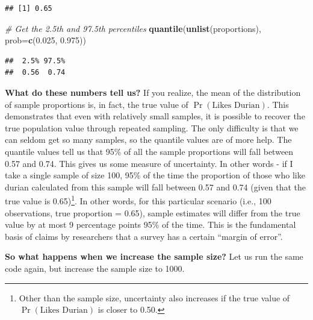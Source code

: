 \documentclass[openany]{book}
\newenvironment{Shaded}{\begin{snugshade}}{\end{snugshade}}
\newcommand{\KeywordTok}[1]{\textcolor[rgb]{0.13,0.29,0.53}{\textbf{#1}}}
\newcommand{\DataTypeTok}[1]{\textcolor[rgb]{0.13,0.29,0.53}{#1}}
\newcommand{\FloatTok}[1]{\textcolor[rgb]{0.00,0.00,0.81}{#1}}
\newcommand{\CommentTok}[1]{\textcolor[rgb]{0.56,0.35,0.01}{\textit{#1}}}
\newcommand{\NormalTok}[1]{#1}
\let\rmarkdownfootnote\footnote%
\def\footnote{\protect\rmarkdownfootnote}
\begin{document}
\begin{verbatim}
## [1] 0.65
\end{verbatim}

\begin{Shaded}
\begin{Highlighting}[]
\CommentTok{# Get the 2.5th and 97.5th percentiles}
\KeywordTok{quantile}\NormalTok{(}\KeywordTok{unlist}\NormalTok{(proportions), }\DataTypeTok{prob=}\KeywordTok{c}\NormalTok{(}\FloatTok{0.025}\NormalTok{, }\FloatTok{0.975}\NormalTok{))}
\end{Highlighting}
\end{Shaded}

\begin{verbatim}
##  2.5% 97.5% 
##  0.56  0.74
\end{verbatim}

\textbf{What do these numbers tell us?} If you realize, the mean of the
distribution of sample proportions is, in fact, the true value of
\(\Pr(\text{Likes Durian})\). This demonstrates that even with
relatively small samples, it is possible to recover the true population
value through repeated sampling. The only difficulty is that we can
seldom get so many samples, so the quantile values are of more help. The
quantile values tell us that 95\% of all the sample proportions will
fall between 0.57 and 0.74. This gives us some measure of uncertainty.
In other words - if I take a single sample of size 100, 95\% of the time
the proportion of those who like durian calculated from this sample will
fall between 0.57 and 0.74 (given that the true value is 0.65)\footnote{Other
  than the sample size, uncertainty also increases if the true value of
  \(\Pr(\text{Likes Durian})\) is closer to 0.50.}. In other words, for
this particular scenario (i.e., 100 observations, true proportion =
0.65), sample estimates will differ from the true value by at most 9
percentage points 95\% of the time. This is the fundamental basis of
claims by researchers that a survey has a certain ``margin of error''.

\textbf{So what happens when we increase the sample size?} Let us run
the same code again, but increase the sample size to 1000.
\end{document}
